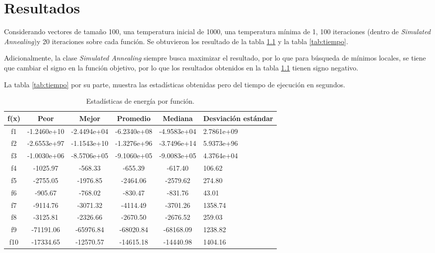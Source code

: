 \chapter{Resultados}

Considerando vectores de tamaño 100, una temperatura inicial de 1000, una temperatura mínima de 1,  100 iteraciones (dentro de \textit{Simulated Annealing})y   20 iteraciones sobre cada función. Se obtuvieron los resultado de la tabla \ref{tab:energy} y la tabla \ref{tab:tiempo}.

Adicionalmente,  la clase \textit{Simulated Annealing} siempre busca maximizar el resultado, por lo que para búsqueda de mínimos locales, se tiene que cambiar el signo en la función objetivo, por lo que los resultados obtenidos en la tabla \ref{tab:energy} tienen signo negativo.

La tabla \ref{tab:tiempo} por su parte, muestra las estadísticas obtenidas pero del tiempo de ejecución en segundos. 

\begin{table}[h]
	\centering
	\begin{tabular}{|c|c|c|c|c|p{2.1cm}|}  
		\hline
		\textbf{f(x)} & \textbf{Peor} & \textbf{Mejor} & \textbf{Promedio} & \textbf{Mediana} & \textbf{Desviación estándar} \\  
		\hline
		f1  & -1.2460e+10 & -2.4494e+04 & -6.2340e+08 & -4.9583e+04 & 2.7861e+09 \\
		f2  & -2.6553e+97  & -1.1543e+10  & -1.3276e+96  & -3.7496e+14  & 5.9373e+96 \\
		f3  & -1.0030e+06  & -8.5706e+05  & -9.1060e+05  & -9.0083e+05  & 4.3764e+04 \\
		f4  & -1025.97     & -568.33     & -655.39     & -617.40     & 106.62 \\
		f5  & -2755.05     & -1976.85    & -2464.06    & -2579.62    & 274.80 \\
		f6  & -905.67      & -768.02     & -830.47     & -831.76     & 43.01 \\
		f7  & -9114.76     & -3071.32    & -4114.49    & -3701.26    & 1358.74 \\
		f8  & -3125.81     & -2326.66    & -2670.50    & -2676.52    & 259.03 \\
		f9  & -71191.06    & -65976.84   & -68020.84   & -68168.09   & 1238.82 \\
		f10 & -17334.65    & -12570.57   & -14615.18   & -14440.98   & 1404.16 \\
		\hline
	\end{tabular}
	\caption{Estadísticas de energía por función.}
	\label{tab:energy}
\end{table}




